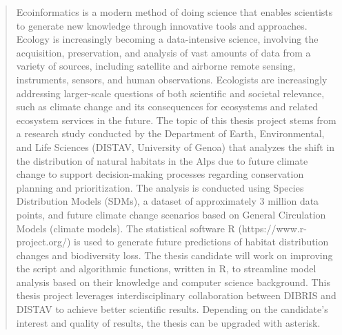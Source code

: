 \begin{abstract}
Ecoinformatics is a modern method of doing science that enables scientists to generate new knowledge through innovative tools and approaches. Ecology is increasingly becoming a data-intensive science, involving the acquisition, preservation, and analysis of vast amounts of data from a variety of sources, including satellite and airborne remote sensing, instruments, sensors, and human observations. Ecologists are increasingly addressing larger-scale questions of both scientific and societal relevance, such as climate change and its consequences for ecosystems and related ecosystem services in the future. The topic of this thesis project stems from a research study conducted by the Department of Earth, Environmental, and Life Sciences (DISTAV, University of Genoa) that analyzes the shift in the distribution of natural habitats in the Alps due to future climate change to support decision-making processes regarding conservation planning and prioritization. The analysis is conducted using Species Distribution Models (SDMs), a dataset of approximately 3 million data points, and future climate change scenarios based on General Circulation Models (climate models). The statistical software R (https://www.r-project.org/) is used to generate future predictions of habitat distribution changes and biodiversity loss. The thesis candidate will work on improving the script and algorithmic functions, written in R, to streamline model analysis based on their knowledge and computer science background. This thesis project leverages interdisciplinary collaboration between DIBRIS and DISTAV to achieve better scientific results.   Depending on the candidate's interest and quality of results, the thesis can be upgraded with asterisk. 
\end{abstract}
